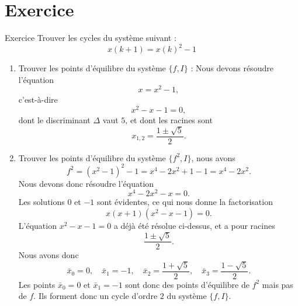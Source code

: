     \section{Exercice} 
        \begin{exercise}{Exercice}
            Trouver les cycles  du système suivant :
            \begin{equation}
                x(k + 1) = x(k)^2 - 1
            \end{equation}
        \end{exercise}
        \begin{enumerate}
            \item Trouver les points d’équilibre du système $\{f, I\}$ :  
            Nous devons résoudre l’équation 
            \begin{equation}
                x = x^2 - 1,
            \end{equation}
            c'est-à-dire
            \begin{equation}
                x^2 - x - 1 = 0,
            \end{equation}
            dont le discriminant $\Delta$ vaut $5$, et dont les racines sont 
            \begin{equation}
                x_{1,2} = \frac{1 \pm \sqrt{5}}{2}.
            \end{equation}
            \item Trouver les points d’équilibre du système $\{f^2, I\}$, nous avons
            \begin{equation}
                f^2 = (x^2 - 1)^2 - 1 = x^4 - 2x^2 + 1 - 1 = x^4 - 2x^2.
            \end{equation}
            Nous devons donc résoudre l’équation 
            \begin{equation}
                x^4 - 2x^2 - x = 0.
            \end{equation}
            Les solutions $0$ et $-1$ sont évidentes, ce qui nous donne la factorisation
            \begin{equation}
                x(x + 1)(x^2 - x - 1) = 0.
            \end{equation}
            L’équation $x^2 - x - 1 = 0$ a déjà été résolue ci-dessus, et a pour racines 
            \begin{equation}
                \frac{1 \pm \sqrt{5}}{2}.
            \end{equation}
            Nous avons donc 
            \begin{equation}
                \bar{x}_0 = 0, \quad \bar{x}_1 = -1, \quad \bar{x}_2 = \frac{1 + \sqrt{5}}{2}, \quad \bar{x}_3 = \frac{1 - \sqrt{5}}{2}.
            \end{equation}
            Les points $\bar{x}_0 = 0$ et $\bar{x}_1 = -1$ sont donc des points d’équilibre de $f^2$ mais pas de $f$. Ils forment donc un cycle d’ordre $2$ du système $\{f, I\}$.
        \end{enumerate}
